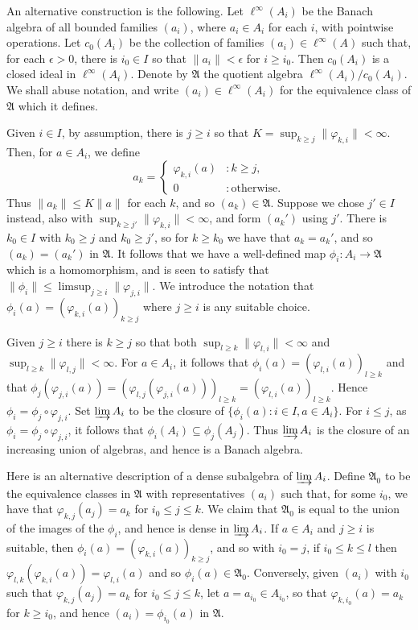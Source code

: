 \documentclass[a4paper,11pt]{article}
\newcommand{\mf}{\mathfrak}
\newcommand{\indlim}{\varinjlim}
\theoremstyle{definition}
\begin{document}
An alternative construction is the following.  Let $\ell^\infty(A_i)$ be the Banach algebra of all
bounded families $(a_i)$, where $a_i\in A_i$ for each $i$, with pointwise operations.
Let $c_0(A_i)$ be the collection of families $(a_i)\in \ell^\infty(A)$ such that, for each
$\epsilon>0$, there is $i_0\in I$ so that $\|a_i\|<\epsilon$ for $i\geq i_0$.  Then $c_0(A_i)$
is a closed ideal in $\ell^\infty(A_i)$.  Denote by $\mf A$ the quotient algebra
$\ell^\infty(A_i) / c_0(A_i)$.  We shall abuse notation, and write $(a_i)\in\ell^\infty(A_i)$
for the equivalence class of $\mf A$ which it defines.

Given $i\in I$, by assumption, there is $j\geq i$ so that
$K = \sup_{k\geq j} \|\varphi_{k,i}\| < \infty$.  Then, for $a\in A_i$, we define
\[ a_k = \begin{cases} \varphi_{k,i}(a) & : k\geq j, \\ 0 & : \text{otherwise}. \end{cases} \]
Thus $\|a_k\| \leq K\|a\|$ for each $k$, and so $(a_k) \in \mf A$.  Suppose we chose $j'\in I$
instead, also with $\sup_{k\geq j'} \|\varphi_{k,i}\| < \infty$, and form $(a_k')$ using $j'$.
There is $k_0\in I$ with $k_0 \geq j$ and $k_0 \geq j'$, so for $k\geq k_0$ we have that
$a_k = a_k'$, and so $(a_k) = (a_k')$ in $\mf A$.  It follows that we have a well-defined map
$\phi_i:A_i\rightarrow\mf A$ which is a homomorphism, and is seen to satisfy that $\|\phi_i\| \leq
\limsup_{j\geq i} \|\varphi_{j,i}\|$.  We introduce the notation that $\phi_i(a) =
( \varphi_{k,i}(a) )_{k\geq j}$ where $j\geq i$ is any suitable choice.

Given $j\geq i$ there is $k\geq j$ so that both $\sup_{l\geq k} \|\varphi_{l,i}\|<\infty$ and
$\sup_{l\geq k} \|\varphi_{l,j}\|<\infty$.  For $a\in A_i$, it follows that $\phi_i(a) =
( \varphi_{l,i}(a) )_{l\geq k}$ and that $\phi_j(\varphi_{j,i}(a)) =
( \varphi_{l,j}(\varphi_{j,i}(a)) )_{l\geq k} = 
( \varphi_{l,i}(a) )_{l\geq k}$.  Hence $\phi_i = \phi_j \circ \varphi_{j,i}$.
Set $\indlim A_i$ to be the closure of $\{\phi_i(a) : i\in I, a\in A_i \}$.  For $i\leq j$, as
$\phi_i = \phi_j \circ \varphi_{j,i}$, it follows that $\phi_i(A_i) \subseteq \phi_j(A_j)$.
Thus $\indlim A_i$ is the closure of an increasing union of algebras, and hence is a Banach algebra.

Here is an alternative description of a dense subalgebra of $\indlim A_i$.
Define $\mf A_0$ to be the equivalence classes in $\mf A$ with representatives $(a_i)$ such that,
for some $i_0$, we have that $\varphi_{k,j}(a_j) = a_k$ for $i_0 \leq j \leq k$.  We claim that
$\mf A_0$ is equal to the union of the images of the $\phi_i$, and hence is dense in
$\indlim A_i$.  If $a\in A_i$ and $j\geq i$ is suitable, then $\phi_i(a) = ( \varphi_{k,i}(a)
)_{k\geq j}$, and so with $i_0=j$, if $i_0 \leq k \leq l$ then $\varphi_{l,k}( \varphi_{k,i}(a) )
= \varphi_{l,i}(a)$ and so $\phi_i(a)\in \mf A_0$.  Conversely, given $(a_i)$ with $i_0$ such that
$\varphi_{k,j}(a_j) = a_k$ for $i_0 \leq j \leq k$, let $a = a_{i_0} \in A_{i_0}$, so that
$\varphi_{k,i_0}(a) = a_k$ for $k\geq i_0$, and hence $(a_i) = \phi_{i_0}(a)$ in $\mf A$.
\end{document}
